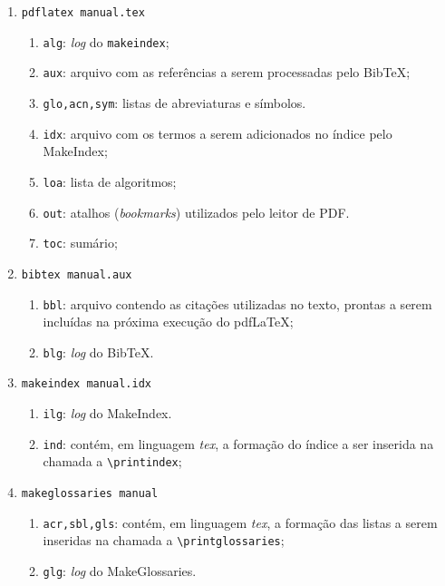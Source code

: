 \documentclass{fei}
\begin{document}
	\begin{enumerate}
	
	\item\verb+pdflatex manual.tex+
	\begin{enumerate}
	\item \texttt{alg}: \emph{log} do \texttt{makeindex};
	\item \texttt{aux}: arquivo com as referências a serem processadas pelo Bib\TeX;
	\item \texttt{glo,acn,sym}: listas de abreviaturas e símbolos.
	\item \texttt{idx}: arquivo com os termos a serem adicionados no índice pelo MakeIndex;	
	\item \texttt{loa}: lista de algoritmos;
	\item \texttt{out}: atalhos (\emph{bookmarks}) utilizados pelo leitor de PDF.
	\item \texttt{toc}: sumário;
	\end{enumerate}	
	
	\item\verb+bibtex manual.aux+
	\begin{enumerate}
	\item \texttt{bbl}: arquivo contendo as citações utilizadas no texto, prontas a serem incluídas na próxima execução do pdf\LaTeX;
	\item \texttt{blg}: \emph{log} do Bib\TeX.
	\end{enumerate}	
	
	\item\verb+makeindex manual.idx+
	\begin{enumerate}
	\item \texttt{ilg}: \emph{log} do MakeIndex.
	\item \texttt{ind}: contém, em linguagem \emph{tex}, a formação do índice a ser inserida na chamada a \verb+\printindex+;
	\end{enumerate}	
	
	\item\verb+makeglossaries manual+
	\begin{enumerate}
	\item \texttt{acr,sbl,gls}:  contém, em linguagem \emph{tex}, a formação das listas a serem inseridas na chamada a \verb+\printglossaries+;
	\item \texttt{glg}: \emph{log} do MakeGlossaries.
	\end{enumerate}
	\end{enumerate}
	
	\indice
	
\end{document}
